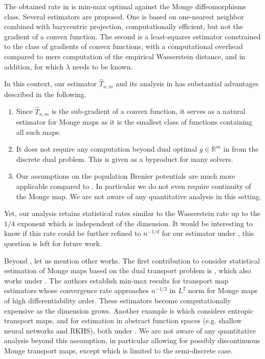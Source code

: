 \documentclass[11pt]{article}
\newcommand{\R}{\mathbb R}
\newcommand{\1}{\mathbbm{1}}
\numberwithin{equation}{section}
\begin{document}
The obtained rate in \cite{manole2024plugin} is min-max optimal against the Monge diffeomorphisms class. Several estimators are proposed. One is based on one-nearest neighbor combined with barycentric projection, computationally efficient, but not the gradient of a convex function. The second is a least-squares estimator constrained to the class of gradients of convex functions, with a computational overhead compared to mere computation of the empirical Wasserstein distance, and in addition, for which $\lambda$ needs to be known. 

In this context, our estimator $\hat{T}_{n,m}$ and its analysis in  has substantial advantages described in the following.
\begin{enumerate}
    \item Since $\hat{T}_{n,m}$ is the sub-gradient of a convex function, it serves as a natural estimator for Monge maps as it is the smallest class of functions containing all such maps.
    \item It does not require any computation beyond dual optimal $g\in\R^m$ in  from the discrete dual problem. This is given as a byproduct for many solvers.
    \item Our assumptions on the population Brenier potentials are much more applicable compared to . In particular we do not even require continuity of the Monge map. We are not aware of any quantitative analysis in this setting.
\end{enumerate}
Yet, our analysis retains statistical rates similar to the Wasserstein rate up to the $1/4$ exponent which is independent of the dimension.  It would be interesting to know if this rate could be further refined to $n^{-1/d}$ for our estimator under , this question is left for future work.

Beyond \cite{manole2024plugin}, let us mention other works. The first contribution to consider statistical estimation of Monge maps based on the dual transport problem is \cite{hutter2021minimax}, which also works under . The authors establish min-max results for transport map estimators whose convergence rate approaches $n^{-1/2}$ in $L^2$ norm for Monge maps of high differentiability order. These estimators become computationally expensive as the dimension grows. Another example is \cite{pooladian2021entropic} which considers entropic transport maps, and \cite{divol2025optimal} for estimation in abstract function spaces (e.g. shallow neural networks and RKHS), both under . We are not aware of any quantitative analysis beyond this assumption, in particular allowing for possibly discontinuous Monge transport maps, except \cite{pooladian2023minimax} which is limited to the semi-discrete case.
\end{document}
